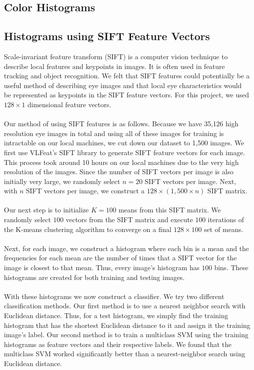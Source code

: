 \documentclass{article} %
\begin{document}
\subsection{Color Histograms}

\subsection{Histograms using SIFT Feature Vectors}

Scale-invariant feature transform (SIFT) is a computer vision technique to describe local features and keypoints in images. It is often used in feature tracking and object recognition. We felt that SIFT features could potentially be a useful method of describing eye images and that local eye characteristics would be represented as keypoints in the SIFT feature vectors. For this project, we used $128 \times 1$ dimensional feature vectors.\\ \\
Our method of using SIFT features is as follows. Because we have 35,126 high resolution eye images in total and using all of these images for training is intractable on our local machines, we cut down our dataset to 1,500 images. We first use VLFeat's SIFT library to generate SIFT feature vectors for each image. This process took around 10 hours on our local machines due to the very high resolution of the images. Since the number of SIFT vectors per image is also initially very large, we randomly select $n=20$ SIFT vectors per image. Next, with $n$ SIFT vectors per image, we construct a $128 \times (1,500 \times n)$ SIFT matrix. \\ \\
Our next step is to initialize $K=100$ means from this SIFT matrix. We randomly select $100$ vectors from the SIFT matrix and execute $100$ iterations of the K-means clustering algorithm to converge on a final $128 \times 100$ set of means. \\ \\
Next, for each image, we construct a histogram where each bin is a mean and the frequencies for each mean are the number of times that a SIFT vector for the image is closest to that mean. Thus, every image's histogram has $100$ bins. These histograms are created for both training and testing images.\\ \\
With these histograms we now construct a classifier. We try two different classification methods. Our first method is to use a nearest neighbor search with Euclidean distance. Thus, for a test histogram, we simply find the training histogram that has the shortest Euclidean distance to it and assign it the training image's label. Our second method is to train a multiclass SVM using the training histograms as feature vectors and their respective labels. We found that the multiclass SVM worked significantly better than a nearest-neighbor search using Euclidean distance. \\ \\
\end{document}
